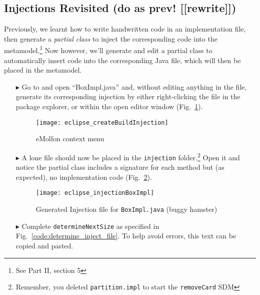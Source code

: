 \subsection{Injections Revisited \update (do as prev! [[rewrite]])}
\genHeader

Previously, we learnt how to write handwritten code in an implementation file, then generate a \emph{partial class} to inject the corresponding code into the
metamodel.\footnote{See Part II, section 5} Now however, we'll generate and edit a partial class to automatically insert code into the corresponding Java file,
which will then be placed in the metamodel.

\begin{itemize}

\item[$\blacktriangleright$] Go to and open ``BoxImpl.java'' and, without editing anything in the file, generate its corresponding injection by
either right-clicking the file in the package explorer, or within the open editor window (Fig.~\ref{fig:createInjection}).

\vspace{0.5cm}

\begin{figure}[htbp]
    \centering
    \texttt{[image: eclipse\_createBuildInjection]}
    \caption{eMolfon context menu}
    \label{fig:createInjection}
\end{figure}

\clearpage

\item[$\blacktriangleright$] A lone file should now be placed in the \texttt{injection} folder.\footnote{Remember, you deleted \texttt{partition.impl} to start
the \texttt{removeCard} SDM} Open it and notice the partial class includes a signature for each method but (as expected), no implementation code
(Fig.~\ref{fig:injection_partialClassBox}).

\vspace{0.5cm}

\begin{figure}[htbp]
    \centering
    \texttt{[image: eclipse\_injectionBoxImpl]}
    \caption{Generated Injection file for \texttt{BoxImpl.java} \update (buggy hamster)}
    \label{fig:injection_partialClassBox}
\end{figure}

\vspace{0.5cm}

\item[$\blacktriangleright$] Complete \texttt{determineNextSize} as specified in Fig.~\ref{code:determine_inject_file}. To help avoid errors, this text can
be copied and pasted.


\end{itemize}
